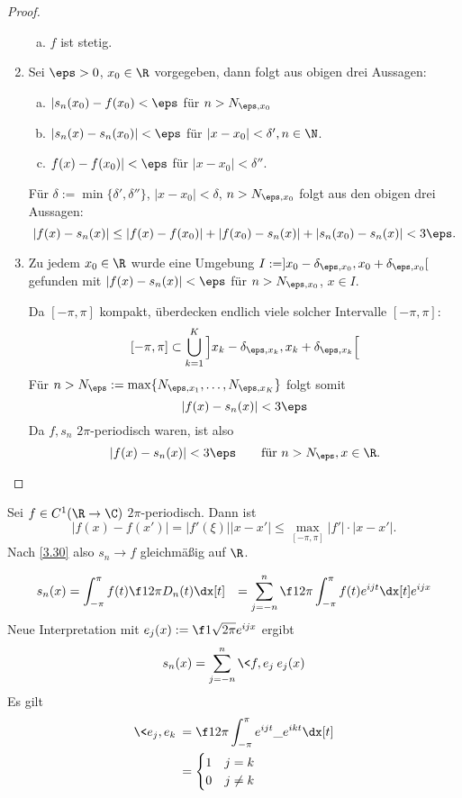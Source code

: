 \begin{st}
\begin{proof}
\begin{enumerate}[1]
\begin{enumerate}[a)]
					\item
						$f$ ist stetig.
				\end{enumerate}
			\item
				Sei $\eps > 0$, $x_0 \in \R$ vorgegeben, dann folgt aus obigen drei Aussagen:
				\begin{enumerate}[a)]
					\item
						$|s_n(x_0) - f(x_0) < \eps$ für $n > N_{\eps, x_0}$
					\item
						$|s_n(x) - s_n(x_0)| < \eps$ für $|x-x_0| < \delta', n\in \N$.
					\item
						$f(x) - f(x_0)| < \eps$ für $|x-x_0| < \delta''$.
				\end{enumerate}
				Für $\delta := \min\{\delta', \delta''\}$, $|x-x_0| < \delta$, $n > N_{\eps, x_0}$ folgt aus den obigen drei Aussagen:
				\[
					|f(x) - s_n(x)| 
					\le |f(x) - f(x_0)| + |f(x_0)-s_n(x)| + |s_n(x_0) - s_n(x)|
					< 3\eps.
				\]
			\item
				Zu jedem $x_0 \in \R$ wurde eine Umgebung $I := ]x_0-\delta_{\eps, x_0}, x_0 + \delta_{\eps, x_0}[$ gefunden mit $|f(x) - s_n(x)| < \eps$ für $n > N_{\eps, x_0}$, $x \in  I$.

				Da $[-\pi,\pi]$ kompakt, überdecken endlich viele solcher Intervalle $[-\pi, \pi]$:
				\[
					[-\pi,\pi] \subset \bigcup_{k=1}^K \Big] x_k - \delta_{\eps, x_k}, x_k + \delta_{\eps, x_k} \Big[
				\]
				Für $n > N_\eps := \max\{N_{\eps, x_1}, \dotsc, N_{\eps, x_K}\}$ folgt somit
				\[
					|f(x) - s_n(x)| < 3\eps
				\]
				Da $f, s_n$ $2\pi$-periodisch waren, ist also
				\[
					|f(x) - s_n(x)| < 3\eps \qquad \text{für $n> N_\eps, x\in \R$.}
				\]
		\end{enumerate}
	\end{proof}
\end{st}

\begin{nt} \label{3.31}
	Sei $f \in C^1(\R \to \C)$ $2\pi$-periodisch.
	Dann ist
	\[
		|f(x) - f(x')| = |f'(\xi)||x-x'| \le \max_{[-\pi,\pi]} |f'|\cdot |x-x'|.
	\]
	Nach \ref{3.30} also $s_n \to f$ gleichmäßig auf $\R$.
\end{nt}

\begin{st} \label{3.32}
	\begin{align*}
		s_n(x) 
		&= \int_{-\pi}^{\pi} f(t) \f 1{2\pi} D_n(t) \dx[t]
		&= \sum_{j=-n}^n \f 1{2\pi} \int_{-\pi}^\pi f(t) e^{ijt} \dx[t] e^{ijx}
	\end{align*}
	Neue Interpretation mit $e_j(x) := \f 1{\sqrt{2\pi}} e^{ijx}$ ergibt
	\[
		s_n(x) = \sum_{j=-n}^n \<f,e_j\> e_j(x)
	\]
	Es gilt
	\begin{align*}
		\<e_j, e_k\> &= \f 1{2\pi} \int_{-\pi}^\pi e^{ijt}\_{e^{ikt}} \dx[t] \\
		&= \begin{cases}
			1 & j=k \\
			0 & j\neq k
		\end{cases}
	\end{align*}
\end{st}

